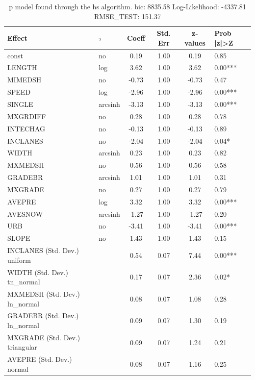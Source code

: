 \begin{table}
	\caption{p model found through the hs algorithm. bic: 8835.58 Log-Likelihood: -4337.81 RMSE_TEST: 151.37}
	\begin{center}
		\begin{tabular}{|l|l|c|c|c|l|}
			\hline
			Effect & $\tau$ & Coeff & Std. Err & z-values & Prob |z|>Z \\
			\hline
			const & no & 0.19 & 1.00 & 0.19 & 0.85 \\
			\hline
			LENGTH & log & 3.62 & 1.00 & 3.62 & 0.00*** \\
			\hline
			MIMEDSH & no & -0.73 & 1.00 & -0.73 & 0.47 \\
			\hline
			SPEED & log & -2.96 & 1.00 & -2.96 & 0.00*** \\
			\hline
			SINGLE & arcsinh & -3.13 & 1.00 & -3.13 & 0.00*** \\
			\hline
			MXGRDIFF & no & 0.28 & 1.00 & 0.28 & 0.78 \\
			\hline
			INTECHAG & no & -0.13 & 1.00 & -0.13 & 0.89 \\
			\hline
			INCLANES & no & -2.04 & 1.00 & -2.04 & 0.04* \\
			\hline
			WIDTH & arcsinh & 0.23 & 1.00 & 0.23 & 0.82 \\
			\hline
			MXMEDSH & no & 0.56 & 1.00 & 0.56 & 0.58 \\
			\hline
			GRADEBR & arcsinh & 1.01 & 1.00 & 1.01 & 0.31 \\
			\hline
			MXGRADE & no & 0.27 & 1.00 & 0.27 & 0.79 \\
			\hline
			AVEPRE & log & 3.32 & 1.00 & 3.32 & 0.00*** \\
			\hline
			AVESNOW & arcsinh & -1.27 & 1.00 & -1.27 & 0.20 \\
			\hline
			URB & no & -3.41 & 1.00 & -3.41 & 0.00*** \\
			\hline
			SLOPE & no & 1.43 & 1.00 & 1.43 & 0.15 \\
			\hline
			INCLANES (Std. Dev.) uniform &  & 0.54 & 0.07 & 7.44 & 0.00*** \\
			\hline
			WIDTH (Std. Dev.) tn_normal &  & 0.17 & 0.07 & 2.36 & 0.02* \\
			\hline
			MXMEDSH (Std. Dev.) ln_normal &  & 0.08 & 0.07 & 1.08 & 0.28 \\
			\hline
			GRADEBR (Std. Dev.) ln_normal &  & 0.09 & 0.07 & 1.30 & 0.19 \\
			\hline
			MXGRADE (Std. Dev.) triangular &  & 0.09 & 0.07 & 1.24 & 0.21 \\
			\hline
			AVEPRE (Std. Dev.) normal &  & 0.08 & 0.07 & 1.16 & 0.25 \\

\end{tabular}
\end{center}
\end{table}

